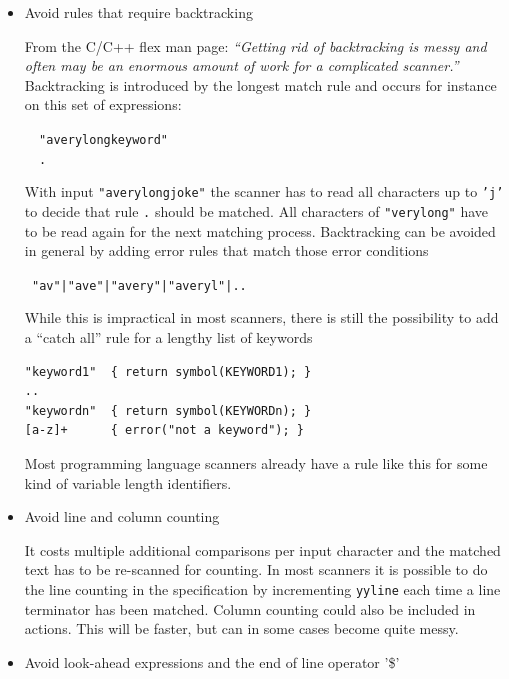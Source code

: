 \documentclass[11pt]{scrartcl}
\newcommand{\trit}{\em}
\begin{document}
\begin{itemize}
\item
Avoid rules that require backtracking

From the C/C++ flex \cite{flex} man page: {\trit ``Getting rid
of backtracking is messy and often may be an enormous amount of work for
a complicated scanner.''} Backtracking is introduced by the longest match
rule and occurs for instance on this set of expressions:
 
\noindent
\texttt{\ \ "averylongkeyword"}\\
\texttt{\ \ .}
 
With input \texttt{"averylongjoke"} the scanner has to read all characters
up to \texttt{'j'} to decide that rule \texttt{.} should be matched. All
characters of \texttt{"verylong"} have to be read again for the next
matching process. Backtracking can be avoided in general by adding
error rules that match those error conditions 

\verb+ "av"|"ave"|"avery"|"averyl"|..+

While this is impractical in most scanners, there is still the
possibility to add a ``catch all'' rule for a lengthy list of keywords
\begin{verbatim}
"keyword1"  { return symbol(KEYWORD1); } 
.. 
"keywordn"  { return symbol(KEYWORDn); }
[a-z]+      { error("not a keyword"); }
\end{verbatim}
Most programming language scanners already have a rule like this for
some kind of variable length identifiers.

\item
  Avoid line and column counting
  
  It costs multiple additional comparisons per input character and the
  matched text has to be re-scanned for counting. In most scanners it
  is possible to do the line counting in the specification by
  incrementing \texttt{yyline} each time a line terminator has been
  matched.  Column counting could also be included in actions. This
  will be faster, but can in some cases become quite messy.
 
\item
  Avoid look-ahead expressions and the end of line operator '\$'


\end{itemize}
\end{document}
